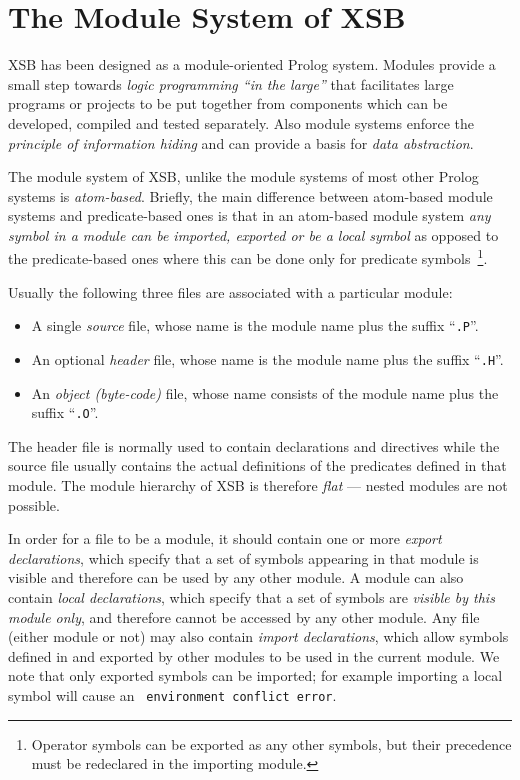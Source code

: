\section{The Module System of XSB} \label{Modules}
XSB has been designed as a module-oriented Prolog system.  Modules
provide a small step towards {\em logic programming ``in the large''}
that facilitates large programs or projects to be put together from
components which can be developed, compiled and tested separately.
Also module systems enforce the {\em principle of information hiding}
and can provide a basis for {\em data abstraction}.

The module system of XSB, unlike the module systems of most
other Prolog systems is {\em atom-based}.  Briefly, the main
difference between atom-based module systems and predicate-based ones
is that in an atom-based module system {\em any symbol in a module can
be imported, exported or be a local symbol} as opposed to the
predicate-based ones where this can be done only for predicate
symbols~\footnote{Operator symbols can be exported as any other
symbols, but their precedence must be redeclared in the importing
module.}.

Usually the following three files are associated with a particular
module:
\begin{itemize}
\item A single {\it source} file, whose name is the module name plus 
      the suffix ``{\tt .P}''.  
\item An optional {\it header} file, whose name is the module name plus 
      the suffix ``{\tt .H}''.  
\item An {\it object (byte-code)} file, whose name consists of the module 
      name plus the suffix ``{\tt .O}''.
\end{itemize}
The header file is normally used to contain declarations and
directives while the source file usually contains the actual
definitions of the predicates defined in that module.  The module
hierarchy of XSB is therefore {\em flat} --- nested modules are not
possible.

In order for a file to be a module, it should contain one or more 
{\it export declarations}, which specify that a set of symbols appearing
in that module is visible and therefore can be used by any other module.
A module can also contain {\it local declarations}, which specify that
a set of symbols are {\it visible by this module only}, and therefore
cannot be accessed by any other module.
Any file (either module or not) may also contain {\it import declarations},
which allow symbols defined in and exported by other modules to be used
in the current module.  We note that only exported symbols can be
imported; for example importing a local symbol will cause an {\tt
environment conflict error}.

